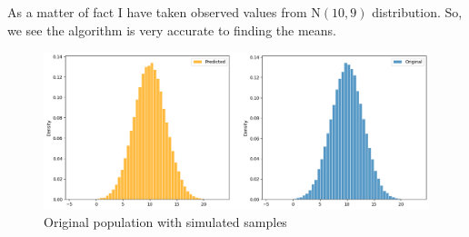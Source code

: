 \begin{example}
    As a matter of fact I have taken observed values from $ \text{N}(10,9) $ distribution. So, we see the algorithm is very accurate to finding the means.

    \begin{figure}[H]
        \centering
        \includegraphics[width=1\textwidth]{images/metropolis/example2/original-with-simulated.png}
        \caption{Original population with simulated samples}
    \end{figure}

\end{example}







